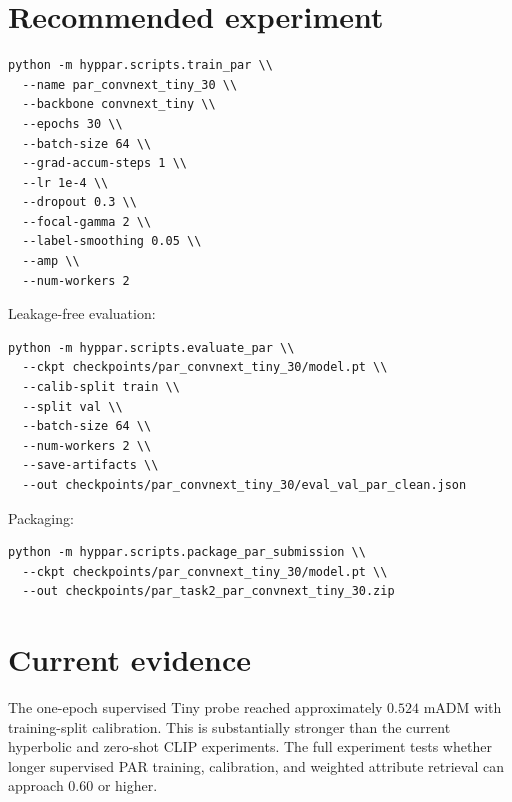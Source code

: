 \documentclass[11pt]{article}
\begin{document}
\section{Recommended experiment}
\begin{lstlisting}[basicstyle=\ttfamily\small,breaklines=true]
python -m hyppar.scripts.train_par \\
  --name par_convnext_tiny_30 \\
  --backbone convnext_tiny \\
  --epochs 30 \\
  --batch-size 64 \\
  --grad-accum-steps 1 \\
  --lr 1e-4 \\
  --dropout 0.3 \\
  --focal-gamma 2 \\
  --label-smoothing 0.05 \\
  --amp \\
  --num-workers 2
\end{lstlisting}

Leakage-free evaluation:
\begin{lstlisting}[basicstyle=\ttfamily\small,breaklines=true]
python -m hyppar.scripts.evaluate_par \\
  --ckpt checkpoints/par_convnext_tiny_30/model.pt \\
  --calib-split train \\
  --split val \\
  --batch-size 64 \\
  --num-workers 2 \\
  --save-artifacts \\
  --out checkpoints/par_convnext_tiny_30/eval_val_par_clean.json
\end{lstlisting}

Packaging:
\begin{lstlisting}[basicstyle=\ttfamily\small,breaklines=true]
python -m hyppar.scripts.package_par_submission \\
  --ckpt checkpoints/par_convnext_tiny_30/model.pt \\
  --out checkpoints/par_task2_par_convnext_tiny_30.zip
\end{lstlisting}

\section{Current evidence}
The one-epoch supervised Tiny probe reached approximately $0.524$ mADM with training-split calibration. This is substantially stronger than the current hyperbolic and zero-shot CLIP experiments. The full experiment tests whether longer supervised PAR training, calibration, and weighted attribute retrieval can approach $0.60$ or higher.
\end{document}
